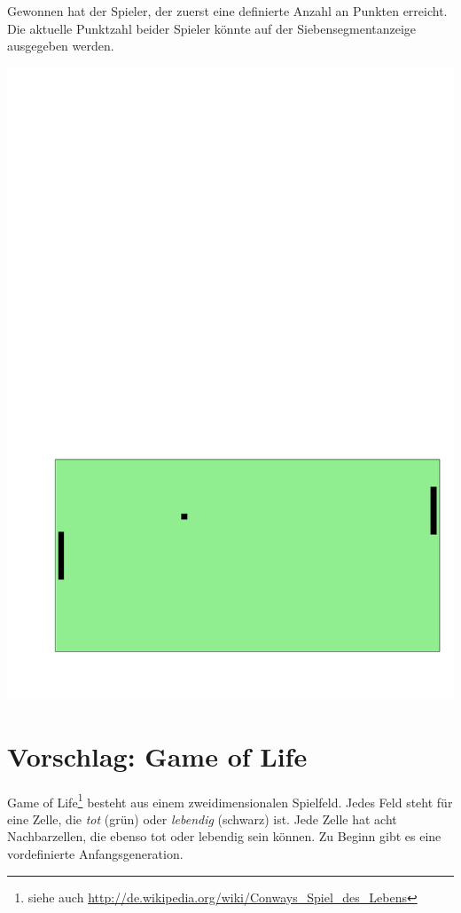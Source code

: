 Gewonnen hat der Spieler, der zuerst eine definierte Anzahl an Punkten erreicht.
Die aktuelle Punktzahl beider Spieler könnte auf der Siebensegmentanzeige ausgegeben werden.
\begin{center}
\includegraphics[scale=0.4]{figures/pong}
\end{center}



\section*{Vorschlag: Game of Life}
\glqq{}Game of Life\grqq{}\footnote{siehe auch \url{http://de.wikipedia.org/wiki/Conways_Spiel_des_Lebens}} besteht aus einem zweidimensionalen Spielfeld.
Jedes Feld steht für eine Zelle, die \textit{tot} (grün) oder \textit{lebendig} (schwarz) ist.
Jede Zelle hat acht Nachbarzellen, die ebenso tot oder lebendig sein können.
Zu Beginn gibt es eine vordefinierte Anfangsgeneration.

